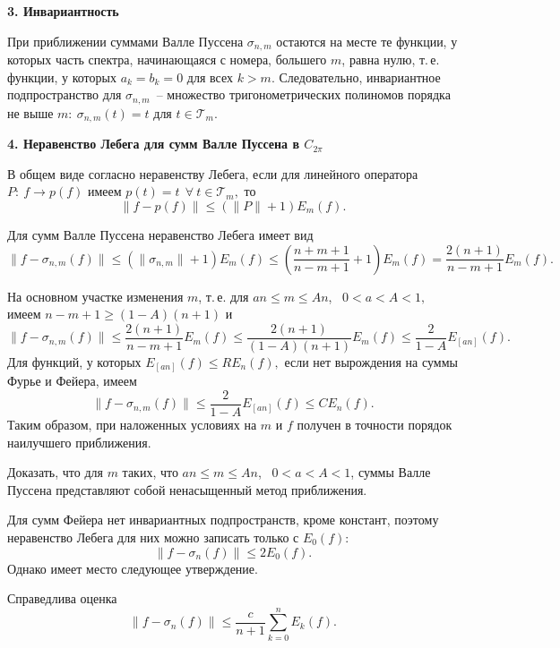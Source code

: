 {\vspace{3mm}
{\bf 3. Инвариантность}
\vspace{3mm}

При приближении суммами Валле Пуссена $\sigma_{n,m}$ остаются
на месте те функции, у которых часть спектра, начинающаяся с номера,
большего $m$, равна нулю, т.\,е. функции, у которых $a_k=b_k=0$ для всех $k>m$.
Следовательно, инвариантное
подпространство {для $\sigma_{n,m}$}~-- множество тригонометрических полиномов
порядка не выше $m:\ \sigma_{n,m}(t)=t$ для $t\in {\mathcal{T}_m}.$

\vspace{3mm}
{\bf 4. Неравенство Лебега для сумм Валле Пуссена в $C_{2\pi}$}
\vspace{3mm}

В общем виде согласно неравенству Лебега, если для линейного оператора
$P:\ f\to p(f)$ имеем $p(t)=t\ \ \forall\ t\in {\mathcal{T}_m},$ то
$$
\|f-p(f)\|\le (\|P\|+1) E_m(f).
$$

Для сумм Валле Пуссена неравенство Лебега  имеет вид
\vspace{2mm}
$$
\|f-\sigma_{n,m}(f)\|\le (\|\sigma_{n,m}\|+1) E_m(f)
\le \left( \frac{n+m+1}{n-m+1}+1 \right) E_m(f) =\frac{2(n+1)}{n-m+1}
E_m(f).
$$
\vspace{3mm}

\noindent На основном участке изменения $m$, т.\,е. для $an\le m\le An$,~ $0<a<A<1,$ {имеем} {$n-m+1\ge
(1-A)(n+1)$} и
\vspace{3mm}
$$
\|f-\sigma_{n,m}(f)\|\le \frac{2(n+1)}{n-m+1} E_m(f)
\le \frac{2(n+1)}{(1-A)(n+1)} E_m(f)
\le
\frac{2}{1-A}E_{[an]}(f).
$$
Для функций, у которых $E_{[an]}(f)\le RE_n(f),$
если нет вырождения на суммы Фурье и Фейера, имеем
$$
\|f-\sigma_{n,m}(f)\|\le \frac{2}{1-A} E_{[an]} (f) \le CE_n(f).
$$
Таким образом, при наложенных условиях на $m$ и $f$ получен в точности
порядок наилучшего приближения.

\begin{task}
Доказать, что для $m$ таких, что $an\le m\le An$,~ $0<a<A<1$, суммы Валле
Пуссена представляют собой ненасыщенный метод приближения.
\end{task}

Для сумм Фейера нет инвариантных подпространств, кроме констант, поэтому
неравенство Лебега для них можно записать только с $E_0(f)$:
$$
\|f-\sigma_n(f)\|\le 2E_0(f).
$$
Однако имеет место следующее утверждение.

\begin{teo}[С.\,Б.\,Стечкин]
Справедлива оценка
$$
\|f-\sigma_n(f)\|\le \frac{c}{n+1}\sum\limits_{k=0}^n E_k(f).
$$
\end{teo}

}
